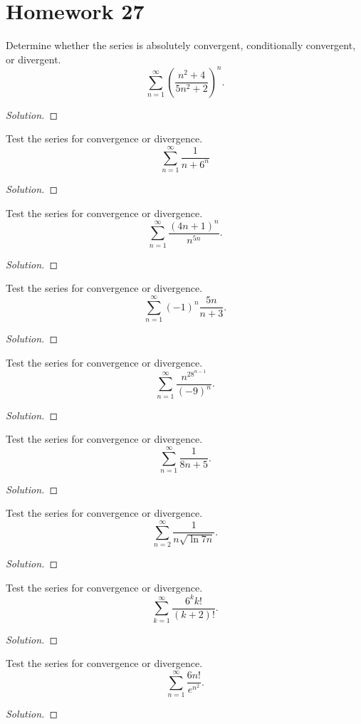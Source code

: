 \section*{Homework 27}
\begin{problem}[WebAssign HW 27, \# 1]
Determine whether the series is absolutely convergent, conditionally
convergent, or divergent.
\[
\sum_{n=1}^\infty\left(\frac{n^2+4}{5n^2+2}\right)^n.
\]
\end{problem}
\begin{proof}[Solution]
\end{proof}
\begin{problem}[WebAssign HW 27, \# 2]
Test the series for convergence or divergence.
\[
\sum_{n=1}^\infty\frac{1}{n+6^n}
\]
\end{problem}
\begin{proof}[Solution]
\end{proof}
\begin{problem}[WebAssign HW 27, \# 3]
Test the series for convergence or divergence.
\[
\sum_{n=1}^\infty\frac{(4n+1)^n}{n^{5n}}.
\]
\end{problem}
\begin{proof}[Solution]
\end{proof}
\begin{problem}[WebAssign HW 27, \# 4]
Test the series for convergence or divergence.
\[
\sum_{n=1}^\infty (-1)^n\frac{5n}{n+3}.
\]
\end{problem}
\begin{proof}[Solution]
\end{proof}
\begin{problem}[WebAssign HW 27, \# 5]
Test the series for convergence or divergence.
\[
\sum_{n=1}^\infty\frac{n^28^{n-1}}{(-9)^n}.
\]
\end{problem}
\begin{proof}[Solution]
\end{proof}
\begin{problem}[WebAssign HW 27, \# 6]
Test the series for convergence or divergence.
\[
\sum_{n=1}^\infty \frac{1}{8n+5}.
\]
\end{problem}
\begin{proof}[Solution]
\end{proof}
\begin{problem}[WebAssign HW 27, \# 7]
Test the series for convergence or divergence.
\[
\sum_{n=2}^\infty\frac{1}{n\sqrt{\ln 7n}}.
\]
\end{problem}
\begin{proof}[Solution]
\end{proof}
\begin{problem}[WebAssign HW 27, \# 8]
Test the series for convergence or divergence.
\[
\sum_{k=1}^\infty\frac{6^kk!}{(k+2)!}.
\]
\end{problem}
\begin{proof}[Solution]
\end{proof}
\begin{problem}[WebAssign HW 27, \# 9]
Test the series for convergence or divergence.
\[
\sum_{n=1}^\infty\frac{6n!}{e^{n^2}}.
\]
\end{problem}
\begin{proof}[Solution]
\end{proof}
